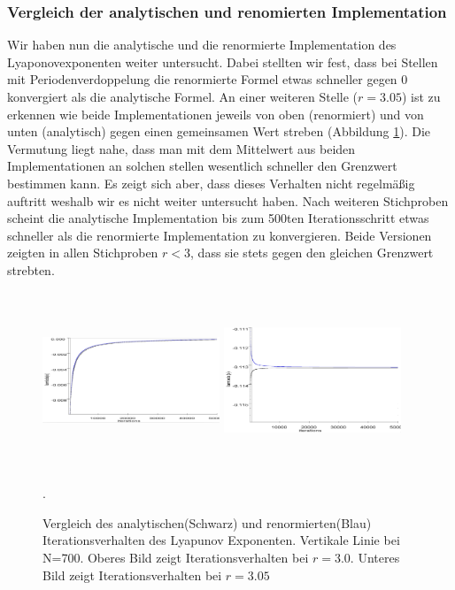 \documentclass{scrartcl}
\begin{document}
\subsubsection{Vergleich der analytischen und renomierten Implementation}
Wir haben nun die analytische und die renormierte Implementation des Lyaponovexponenten weiter untersucht. Dabei stellten wir fest, dass bei Stellen mit Periodenverdoppelung die renormierte Formel etwas schneller gegen 0 konvergiert als die analytische Formel. An einer weiteren Stelle ($r=3.05$) ist zu erkennen wie beide Implementationen jeweils von oben (renormiert) und von unten (analytisch) gegen einen gemeinsamen Wert streben (Abbildung \ref{fig:lyapunov-compare}). Die Vermutung liegt nahe, dass man mit dem Mittelwert aus beiden Implementationen an solchen stellen wesentlich schneller den Grenzwert bestimmen kann. Es zeigt sich aber, dass dieses Verhalten nicht regelmäßig auftritt weshalb wir es nicht weiter untersucht haben. Nach weiteren Stichproben scheint die analytische Implementation bis zum 500ten Iterationsschritt etwas schneller als die renormierte Implementation zu konvergieren. Beide Versionen zeigten in allen Stichproben $r<3$, dass sie stets gegen den gleichen Grenzwert strebten.
\begin{figure}
\centering
\includegraphics[width=200px, height=200px]{lyapunov-analysis-300}
\includegraphics[width=200px, height=200px]{lyapunov-analysis-305}
\caption{Vergleich des analytischen(Schwarz) und renormierten(Blau) Iterationsverhalten des Lyapunov Exponenten. Vertikale Linie bei N=700. Oberes Bild zeigt Iterationsverhalten bei $r=3.0$. Unteres Bild zeigt Iterationsverhalten bei $r=3.05$ }. 
\label{fig:lyapunov-compare}
\end{figure}
\end{document}
